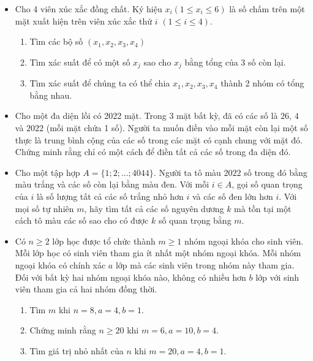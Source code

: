\documentclass[11pt]{scrartcl}
\begin{document}
\begin{itemize}[label=, leftmargin=0em, itemsep=0.5em]
    \item \begin{btvn}
        Cho 4 viên xúc xắc đồng chất. Ký hiệu $x_i (1\le x_i \le 6)$ là số chấm trên một mặt xuất hiện trên viên xúc xắc thứ $i$ $(1\le i \le 4)$.
        \begin{enumerate}[label=(\alph*)]
            \item Tìm các bộ số $(x_1,x_2,x_3,x_4)$
            \item Tìm xác suất để có một số $x_j$ sao cho $x_j$ bằng tổng của 3 số còn lại.
            \item Tìm xác suất để chúng ta có thể chia $x_1,x_2,x_3,x_4$ thành 2 nhóm có tổng bằng nhau.
        \end{enumerate}
    \end{btvn}

    \item \begin{btvn} Cho một đa diện lồi có 2022 mặt. Trong 3 mặt bất kỳ, đã có các số là $26$, $4$ và $2022$ (mỗi mặt chứa 1 số). Người ta muốn điền vào mỗi mặt còn lại một số thực là trung bình cộng của các số trong các mặt có cạnh chung với mặt đó. Chứng minh rằng chỉ có một cách để điền tất cả các số trong đa diện đó.
    \end{btvn}

    \item \begin{btvn} Cho một tập hợp $A=\{1;2;...;4044\}$. Người ta tô màu $2022$ số trong đó bằng màu trắng và các số còn lại bằng màu đen. Với mỗi $i\in A$, gọi số quan trọng của $i$ là số lượng tất cả các số trắng nhỏ hơn $i$ và các số đen lớn hơn $i$. Với mọi số tự nhiên $m$, hãy tìm tất cả các số nguyên dương $k$ mà tồn tại một cách tô màu các số sao cho có được $k$ số quan trọng bằng $m$.

    \end{btvn}

    \item \begin{btvn}
        Có $n \geq 2$ lớp học được tổ chức thành $m \geq 1$ nhóm ngoại khóa cho sinh viên. Mỗi lớp học có sinh viên tham gia ít nhất một nhóm ngoại khóa. Mỗi nhóm ngoại khóa có chính xác $a$ lớp mà các sinh viên trong nhóm này tham gia. Đối với bất kỳ hai nhóm ngoại khóa nào, không có nhiều hơn $b$ lớp với sinh viên tham gia cả hai nhóm đồng thời.
        \begin{enumerate}[label=(\alph*)]
            \item Tìm $m$ khi $n = 8, a = 4 , b = 1$.
            \item Chứng minh rằng $n \geq 20$ khi $m = 6 , a = 10 , b = 4$.
            \item Tìm giá trị nhỏ nhất của $n$ khi $m = 20 , a = 4 , b = 1$.
        \end{enumerate}
    \end{btvn}


\end{itemize}
\end{document}
